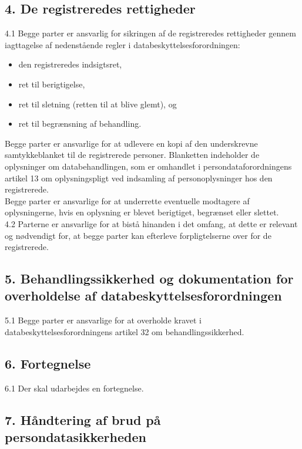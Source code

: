 \documentclass[11pt, a4paper]{article}
\begin{document}
\subsection*{4. De registreredes rettigheder}

4.1 Begge parter er ansvarlig for sikringen af de registreredes rettigheder gennem iagttagelse af nedenstående regler i databeskyttelsesforordningen:
\begin{itemize}
	\item den registreredes indsigtsret,
	\item ret til berigtigelse,
	\item ret til sletning (retten til at blive glemt), og
	\item ret til begrænsning af behandling.
\end{itemize}

Begge parter er ansvarlige for at udlevere en kopi af den underskrevne samtykkeblanket til de registrerede personer. Blanketten indeholder de oplysninger om databehandlingen, som er omhandlet i persondataforordningens artikel 13 om oplysningspligt ved indsamling af personoplysninger hos den registrerede.\\

Begge parter er ansvarlige for at underrette eventuelle modtagere af oplysningerne, hvis en oplysning er blevet berigtiget, begrænset eller slettet.\\

4.2 Parterne er ansvarlige for at bistå hinanden i det omfang, at dette er relevant og nødvendigt for, at begge parter kan efterleve forpligtelserne over for de registrerede.

\subsection*{5. Behandlingssikkerhed og dokumentation for overholdelse af databeskyttelsesforordningen}

5.1 Begge parter er ansvarlige for at overholde kravet i databeskyttelsesforordningens artikel 32 om behandlingssikkerhed.

\subsection*{6. Fortegnelse}

6.1 Der skal udarbejdes en fortegnelse.

\subsection*{7. Håndtering af brud på persondatasikkerheden}
\end{document}
